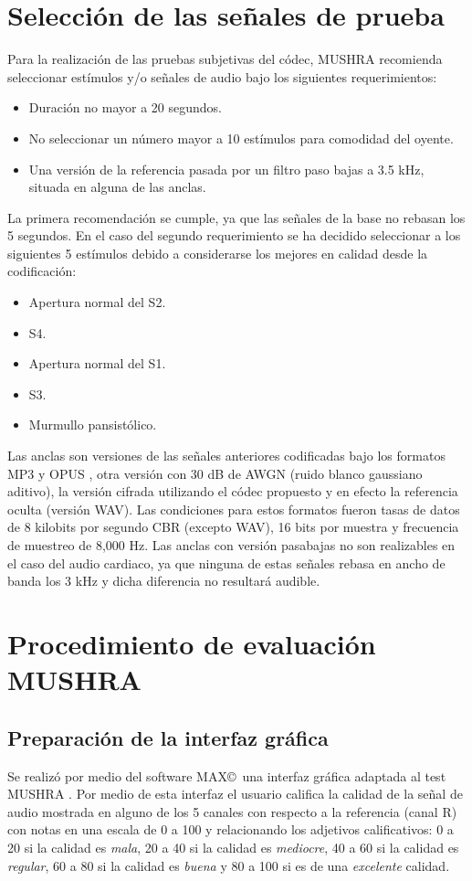 \section{Selección de las señales de prueba}
Para la realización de las pruebas subjetivas del códec, MUSHRA recomienda seleccionar estímulos y/o señales de audio bajo los siguientes requerimientos:
\begin{itemize}
	\item Duración no mayor a 20 segundos.
	\item No seleccionar un número mayor a 10 estímulos para comodidad del oyente.
	\item Una versión de la referencia pasada por un filtro paso bajas a 3.5 kHz, situada en alguna de las anclas.
\end{itemize}
La primera recomendación se cumple, ya que las señales de la base no rebasan los 5 segundos. En el caso del segundo requerimiento se ha decidido seleccionar a los siguientes 5 estímulos debido a considerarse los mejores en calidad desde la codificación:
\begin{itemize}
	\item Apertura normal del S2.
	\item S4.
	\item Apertura normal del S1.
	\item S3.
	\item Murmullo pansistólico.
\end{itemize}

Las anclas son versiones de las señales anteriores codificadas bajo los formatos MP3 \cite[]{Noll1997} y OPUS \cite[]{Valin2010a}, otra versión con 30 dB de AWGN (ruido blanco gaussiano aditivo), la versión cifrada utilizando el códec propuesto y en efecto la referencia oculta (versión WAV). Las condiciones para estos formatos fueron tasas de datos de 8 kilobits por segundo CBR (excepto WAV), 16 bits por muestra y frecuencia de muestreo de 8,000 Hz. Las anclas con versión pasabajas no son realizables en el caso del audio cardiaco, ya que ninguna de estas señales rebasa en ancho de banda los 3 kHz y dicha diferencia no resultará audible.

\section{Procedimiento de evaluación MUSHRA}
\subsection{Preparación de la interfaz gráfica }
Se realizó por medio del software MAX\copyright~una interfaz gráfica adaptada al test MUSHRA \cite[]{Hummersone2011}. Por medio de esta interfaz el usuario califica la calidad de la señal de audio mostrada en alguno de los 5 canales con respecto a la referencia (canal R) con notas en una escala de 0 a 100 y relacionando los adjetivos calificativos: 0 a 20 si la calidad es \emph{mala}, 20 a 40 si la calidad es \emph{mediocre}, 40 a 60 si la calidad es \emph{regular}, 60 a 80 si la calidad es \emph{buena} y 80 a 100 si es de una \emph{excelente} calidad. 

